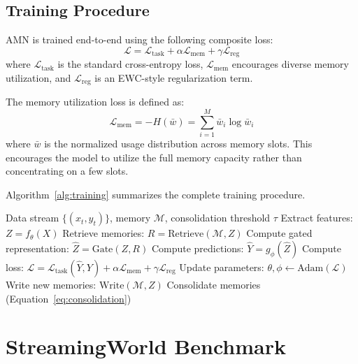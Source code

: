 \documentclass[11pt]{article}
\begin{document}
\subsection{Training Procedure}

AMN is trained end-to-end using the following composite loss:
\begin{equation}
    \mathcal{L} = \mathcal{L}_{\text{task}} + \alpha \mathcal{L}_{\text{mem}} + \gamma \mathcal{L}_{\text{reg}}
\end{equation}
where $\mathcal{L}_{\text{task}}$ is the standard cross-entropy loss, $\mathcal{L}_{\text{mem}}$ encourages diverse memory utilization, and $\mathcal{L}_{\text{reg}}$ is an EWC-style regularization term.

The memory utilization loss is defined as:
\begin{equation}
    \mathcal{L}_{\text{mem}} = -H(\bar{w}) = \sum_{i=1}^{M} \bar{w}_i \log \bar{w}_i
\end{equation}
where $\bar{w}$ is the normalized usage distribution across memory slots. This encourages the model to utilize the full memory capacity rather than concentrating on a few slots.

Algorithm~\ref{alg:training} summarizes the complete training procedure.

\begin{algorithm}
\caption{AMN Training}
\label{alg:training}
\begin{algorithmic}[1]
\REQUIRE Data stream $\{(x_t, y_t)\}$, memory $\mathcal{M}$, consolidation threshold $\tau$
    \STATE Extract features: $Z = f_\theta(X)$
    \STATE Retrieve memories: $R = \text{Retrieve}(\mathcal{M}, Z)$
    \STATE Compute gated representation: $\hat{Z} = \text{Gate}(Z, R)$
    \STATE Compute predictions: $\hat{Y} = g_\phi(\hat{Z})$
    \STATE Compute loss: $\mathcal{L} = \mathcal{L}_{\text{task}}(\hat{Y}, Y) + \alpha \mathcal{L}_{\text{mem}} + \gamma \mathcal{L}_{\text{reg}}$
    \STATE Update parameters: $\theta, \phi \leftarrow \text{Adam}(\mathcal{L})$
    \STATE Write new memories: $\text{Write}(\mathcal{M}, Z)$
        \STATE Consolidate memories (Equation~\ref{eq:consolidation})
    \ENDIF
\ENDFOR
\end{algorithmic}
\end{algorithm}

\section{StreamingWorld Benchmark}
\label{sec:benchmark}
\end{document}
